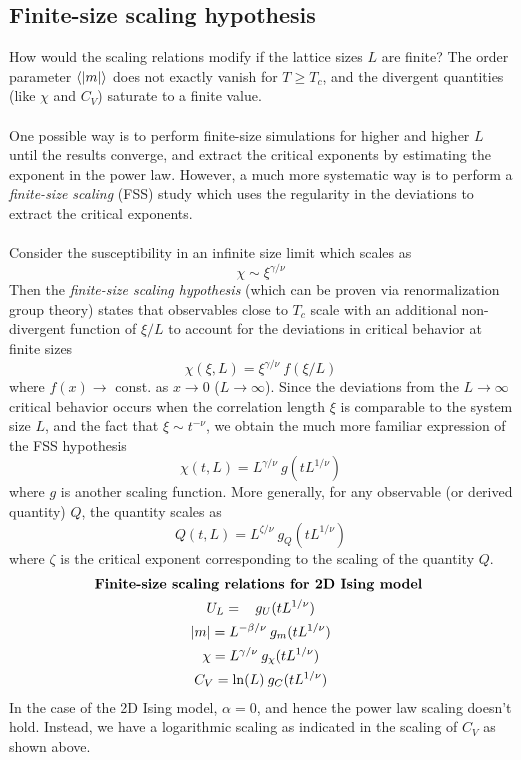\documentclass[../journal_main.tex]{subfiles}
\begin{document}
\subsection{Finite-size scaling hypothesis}
How would the scaling relations modify if the lattice sizes $L$ are finite? The order parameter $\expval{|m|}$ does not exactly vanish for $T \geq T_c$, and the divergent quantities (like $\chi$ and $C_V$) saturate to a finite value.~\\~\\
One possible way is to perform finite-size simulations for higher and higher $L$ until the results converge, and extract the critical exponents by estimating the exponent in the power law. However, a much more systematic way is to perform a \textit{finite-size scaling} (FSS) study which uses the regularity in the deviations to extract the critical exponents.~\\~\\
Consider the susceptibility in an infinite size limit which scales as 
\[
   \chi \sim \xi^{\gamma/\nu}
\]
Then the \textit{finite-size scaling hypothesis} (which can be proven via renormalization group theory) states that observables close to $T_c$ scale with an additional non-divergent function of $\xi/L$ to account for the deviations in critical behavior at finite sizes
\begin{equation}
    \chi(\xi, L) = \xi^{\gamma/\nu} \: f(\xi/L)
\end{equation}
where $f(x) \to $ const. as $x \to 0$ ($L \to \infty$). Since the deviations from the $L \to \infty$ critical behavior occurs when the correlation length $\xi$ is comparable to the system size $L$, and the fact that $\xi \sim t^{-\nu}$, we obtain the much more familiar expression of the FSS hypothesis 
\begin{equation}
    \chi(t, L) = L^{\gamma/\nu} \: g(t L^{1/\nu})
\end{equation}
where $g$ is another scaling function. More generally, for any observable (or derived quantity) $Q$, the quantity scales as
\begin{equation}
    Q(t, L) = L^{\zeta/\nu} \: g_Q(t L^{1/\nu})
\end{equation}
where $\zeta$ is the critical exponent corresponding to the scaling of the quantity $Q$.  
\begin{gather}
    \text{\textbf{Finite-size scaling relations for 2D Ising model} } \\
    U_L =\:\:\: \: g_U(t L^{1/\nu}) \nonumber \\ 
    |m| = L^{-\beta/\nu} \: g_{m}(t L^{1/\nu}) \nonumber \\
    \chi = L^{\gamma/\nu} \: g_\chi(t L^{1/\nu}) \nonumber \\
    C_V = \ln(L) \: g_C(t L^{1/\nu}) \nonumber
\end{gather}
In the case of the 2D Ising model, $\alpha = 0$, and hence the power law scaling doesn't hold. Instead, we have a logarithmic scaling as indicated in the scaling of $C_V$ as shown above.
\end{document}

